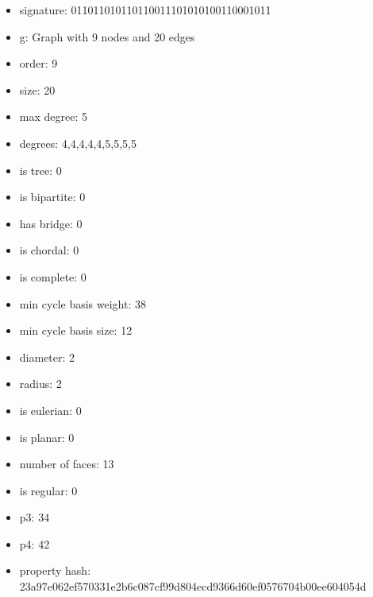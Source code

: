 \newpage
\begin{figure}
\end{figure}
\begin{itemize}
\item signature: 011011010110110011101010100110001011
\item g: Graph with 9 nodes and 20 edges
\item order: 9
\item size: 20
\item max degree: 5
\item degrees: 4,4,4,4,4,5,5,5,5
\item is tree: 0
\item is bipartite: 0
\item has bridge: 0
\item is chordal: 0
\item is complete: 0
\item min cycle basis weight: 38
\item min cycle basis size: 12
\item diameter: 2
\item radius: 2
\item is eulerian: 0
\item is planar: 0
\item number of faces: 13
\item is regular: 0
\item p3: 34
\item p4: 42
\item property hash: 23a97e062ef570331e2b6c087cf99d804ecd9366d60ef0576704b00ee604054d
\end{itemize}
